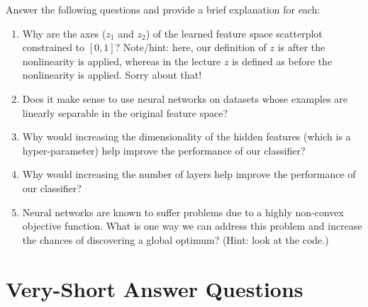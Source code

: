 \documentclass{article}
\newcommand{\blu}[1]{{\textcolor{blu}{#1}}}
\let\ask\blu
\begin{document}
\ask{Answer the following questions and provide a brief explanation for each:}

\begin{enumerate}
	\item Why are the axes ($z_1$ and $z_2$) of the learned feature space scatterplot constrained to $[0, 1]$? Note/hint: here, our definition of $z$ is after the nonlinearity is applied, whereas in the lecture $z$ is defined as before the nonlinearity is applied. Sorry about that!
	\item Does it make sense to use neural networks on datasets whose examples are linearly separable in the original feature space?
	\item Why would increasing the dimensionality of the hidden features (which is a hyper-parameter) help improve the performance of our classifier?
	\item Why would increasing the number of layers help improve the performance of our classifier?
	\item Neural networks are known to suffer problems due to a highly non-convex objective function. What is one way we can address this problem and increase the chances of discovering a global optimum? (Hint: look at the code.)
\end{enumerate}


\section{Very-Short Answer Questions}
\end{document}
